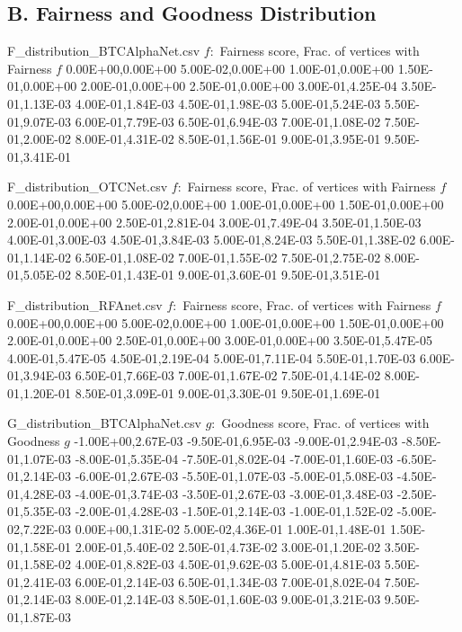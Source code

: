 
\subsection*{B. Fairness and Goodness Distribution}


\begin{filecontents*}{F_distribution_BTCAlphaNet.csv}
  $f:$ Fairness score, Frac. of vertices with Fairness $f$
  0.00E+00,0.00E+00
  5.00E-02,0.00E+00
  1.00E-01,0.00E+00
  1.50E-01,0.00E+00
  2.00E-01,0.00E+00
  2.50E-01,0.00E+00
  3.00E-01,4.25E-04
  3.50E-01,1.13E-03
  4.00E-01,1.84E-03
  4.50E-01,1.98E-03
  5.00E-01,5.24E-03
  5.50E-01,9.07E-03
  6.00E-01,7.79E-03
  6.50E-01,6.94E-03
  7.00E-01,1.08E-02
  7.50E-01,2.00E-02
  8.00E-01,4.31E-02
  8.50E-01,1.56E-01
  9.00E-01,3.95E-01
  9.50E-01,3.41E-01
  \end{filecontents*}
  
  \begin{filecontents*}{F_distribution_OTCNet.csv}
  $f:$ Fairness score, Frac. of vertices with Fairness $f$
  0.00E+00,0.00E+00
  5.00E-02,0.00E+00
  1.00E-01,0.00E+00
  1.50E-01,0.00E+00
  2.00E-01,0.00E+00
  2.50E-01,2.81E-04
  3.00E-01,7.49E-04
  3.50E-01,1.50E-03
  4.00E-01,3.00E-03
  4.50E-01,3.84E-03
  5.00E-01,8.24E-03
  5.50E-01,1.38E-02
  6.00E-01,1.14E-02
  6.50E-01,1.08E-02
  7.00E-01,1.55E-02
  7.50E-01,2.75E-02
  8.00E-01,5.05E-02
  8.50E-01,1.43E-01
  9.00E-01,3.60E-01
  9.50E-01,3.51E-01
  \end{filecontents*}
  
  \begin{filecontents*}{F_distribution_RFAnet.csv}
  $f:$ Fairness score, Frac. of vertices with Fairness $f$
  0.00E+00,0.00E+00
  5.00E-02,0.00E+00
  1.00E-01,0.00E+00
  1.50E-01,0.00E+00
  2.00E-01,0.00E+00
  2.50E-01,0.00E+00
  3.00E-01,0.00E+00
  3.50E-01,5.47E-05
  4.00E-01,5.47E-05
  4.50E-01,2.19E-04
  5.00E-01,7.11E-04
  5.50E-01,1.70E-03
  6.00E-01,3.94E-03
  6.50E-01,7.66E-03
  7.00E-01,1.67E-02
  7.50E-01,4.14E-02
  8.00E-01,1.20E-01
  8.50E-01,3.09E-01
  9.00E-01,3.30E-01
  9.50E-01,1.69E-01
  \end{filecontents*}
  
  \begin{filecontents*}{G_distribution_BTCAlphaNet.csv}
  $g:$ Goodness score, Frac. of vertices with Goodness $g$
  -1.00E+00,2.67E-03
  -9.50E-01,6.95E-03
  -9.00E-01,2.94E-03
  -8.50E-01,1.07E-03
  -8.00E-01,5.35E-04
  -7.50E-01,8.02E-04
  -7.00E-01,1.60E-03
  -6.50E-01,2.14E-03
  -6.00E-01,2.67E-03
  -5.50E-01,1.07E-03
  -5.00E-01,5.08E-03
  -4.50E-01,4.28E-03
  -4.00E-01,3.74E-03
  -3.50E-01,2.67E-03
  -3.00E-01,3.48E-03
  -2.50E-01,5.35E-03
  -2.00E-01,4.28E-03
  -1.50E-01,2.14E-03
  -1.00E-01,1.52E-02
  -5.00E-02,7.22E-03
  0.00E+00,1.31E-02
  5.00E-02,4.36E-01
  1.00E-01,1.48E-01
  1.50E-01,1.58E-01
  2.00E-01,5.40E-02
  2.50E-01,4.73E-02
  3.00E-01,1.20E-02
  3.50E-01,1.58E-02
  4.00E-01,8.82E-03
  4.50E-01,9.62E-03
  5.00E-01,4.81E-03
  5.50E-01,2.41E-03
  6.00E-01,2.14E-03
  6.50E-01,1.34E-03
  7.00E-01,8.02E-04
  7.50E-01,2.14E-03
  8.00E-01,2.14E-03
  8.50E-01,1.60E-03
  9.00E-01,3.21E-03
  9.50E-01,1.87E-03
  \end{filecontents*}
  
